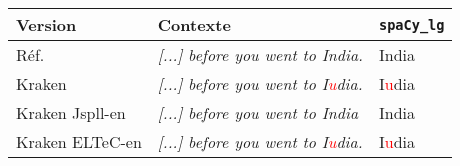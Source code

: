 
\begin{tabular}{|l|l|l|}

\hline

\bf{Version} & \bf {Contexte} & \bf{\texttt{spaCy\_lg}} \\
\hline 
Réf.\ &\textit{[...] before you went to India.} &India \\
 Kraken &\textit{[...] before you went to I\textcolor{red}{u}dia.}&I\textcolor{red}{u}dia \\ 
 Kraken Jspll-en &\textit{[...] before you went to India}&India \\ 
 Kraken ELTeC-en &\textit{[...] before you went to I\textcolor{red}{u}dia.}&I\textcolor{red}{u}dia \\ 

\hline
\end{tabular}



%
%
%
